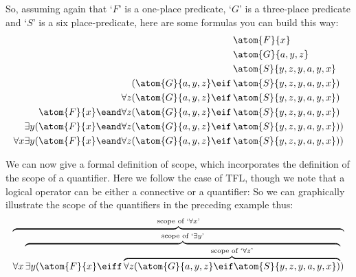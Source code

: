 So, assuming again that `$F$' is a one-place predicate, `$G$' is a three-place predicate and `$S$' is a six place-predicate, here are some formulas you can build this way:
	\begin{align*}
		& \atom{F}{x}\\
		& \atom{G}{a,y,z}\\
		& \atom{S}{y,z,y,a,y,x}\\
		(\atom{G}{a,y,z} \eif \,& \atom{S}{y,z,y,a,y,x})\\
		\forall z (\atom{G}{a,y,z} \eif \,& \atom{S}{y,z,y,a,y,x})\\
		\atom{F}{x} \eand \forall z (\atom{G}{a,y,z} \eif \,& \atom{S}{y,z,y,a,y,x})\\
		\exists y (\atom{F}{x} \eand \forall z (\atom{G}{a,y,z} \eif \,& \atom{S}{y,z,y,a,y,x}))\\
		\forall x \exists y (\atom{F}{x} \eand \forall z (\atom{G}{a,y,z} \eif \,& \atom{S}{y,z,y,a,y,x}))
	\end{align*}

We can now give a formal definition of scope, which incorporates the definition of the scope of a quantifier. Here we follow the case of TFL, though we note that a logical operator can be either a connective or a quantifier:
So we can graphically illustrate the scope of the quantifiers in the
preceding example thus:
$$\overbrace{\forall x \overbrace{\exists y (\atom{F}{x} \eiff
\overbrace{\forall z (\atom{G}{a,y,z} \eif
\atom{S}{y,z,y,a,y,x})}^{\text{scope of `}\forall
z\text{'}}}^{\text{scope of `}\exists y\text{'}})}^{\text{scope of
`$\forall x$'}}$$


